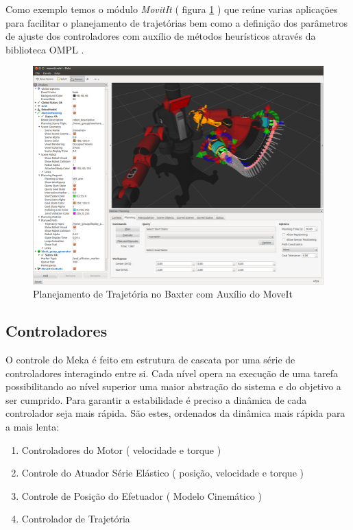 Como exemplo temos o módulo \textit{MovitIt} ( figura \ref{fig:movit-baxter} ) que reúne varias aplicações para facilitar o planejamento de trajetórias bem como a definição dos parâmetros de ajuste dos controladores com auxílio de métodos heurísticos através da biblioteca OMPL \cite{openMPL}.

\begin{figure}[H]
    \centering
    \includegraphics[width=0.7\linewidth]{tex/figs/movit-ros-baxter.png}
    \caption{Planejamento de Trajetória no Baxter com Auxílio do MoveIt \cite{coleman2014reducing}}
    \label{fig:movit-baxter}
\end{figure}

\subsection{Controladores}

O controle do Meka é feito em estrutura de cascata por uma série de controladores interagindo entre si. Cada nível opera na execução de uma tarefa possibilitando ao nível superior uma maior abstração do sistema e do objetivo a ser cumprido. Para garantir a estabilidade é preciso a dinâmica de cada controlador seja mais rápida. São estes, ordenados da dinâmica mais rápida para a mais lenta:

\begin{enumerate}
    \item Controladores do Motor ( velocidade e torque )
    \item Controle do Atuador Série Elástico ( posição, velocidade e torque )
    \item Controle de Posição do Efetuador ( Modelo Cinemático )
    \item Controlador de Trajetória
\end{enumerate}


